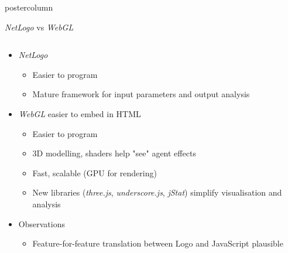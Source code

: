 \documentclass[final,hyperref={pdfpagelabels=false}]{beamer}
\newlength{\columnheight}
\begin{document}
\begin{frame}
\begin{columns}[T]
    \begin{column}{.33\textwidth}
      \begin{beamercolorbox}[center,wd=\textwidth]{postercolumn}
        \begin{minipage}[T]{.95\textwidth} %
          \parbox[t][\columnheight]{\textwidth}{ %

            \begin{block}{\textit{NetLogo} vs \textit{WebGL}}
              \begin{columns}
                \begin{column}{.99\textwidth}
                  \begin{itemize}
                    \item \textit{NetLogo}
                      \begin{itemize}
                        \item Easier to program
                        \item Mature framework for input parameters and output analysis
                      \end{itemize}
                    \item \textit{WebGL} easier to embed in HTML
                      \begin{itemize}
                        \item Easier to program
                        \item 3D modelling, shaders help "see" agent effects
                        \item Fast, scalable (GPU for rendering)
                        \item New libraries (\textit{three.js}, \textit{underscore.js}, \textit{jStat}) simplify visualisation and analysis
                      \end{itemize}
                    \item Observations
                      \begin{itemize}
                        \item Feature-for-feature translation between Logo and JavaScript plausible

\end{itemize}
\end{itemize}
\end{column}
\end{columns}
\end{block}}
\end{minipage}
\end{beamercolorbox}
\end{column}
\end{columns}
\end{frame}
\end{document}
